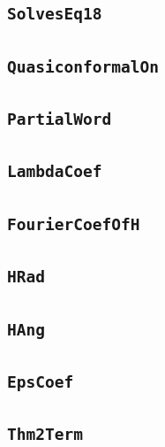 \documentclass[11pt]{amsart}
\theoremstyle{definition}
\begin{document}
\subsection{\texorpdfstring{\texttt{SolvesEq18}}{SolvesEq18}}\label{node:SolvesEq18}


\subsection{\texorpdfstring{\texttt{QuasiconformalOn}}{QuasiconformalOn}}\label{node:QuasiconformalOn}


\subsection{\texorpdfstring{\texttt{PartialWord}}{PartialWord}}\label{node:PartialWord}


\subsection{\texorpdfstring{\texttt{LambdaCoef}}{LambdaCoef}}\label{node:LambdaCoef}


\subsection{\texorpdfstring{\texttt{FourierCoefOfH}}{FourierCoefOfH}}\label{node:FourierCoefOfH}


\subsection{\texorpdfstring{\texttt{HRad}}{HRad}}\label{node:HRad}


\subsection{\texorpdfstring{\texttt{HAng}}{HAng}}\label{node:HAng}


\subsection{\texorpdfstring{\texttt{EpsCoef}}{EpsCoef}}\label{node:EpsCoef}


\subsection{\texorpdfstring{\texttt{Thm2Term}}{Thm2Term}}\label{node:Thm2Term}

\end{document}
